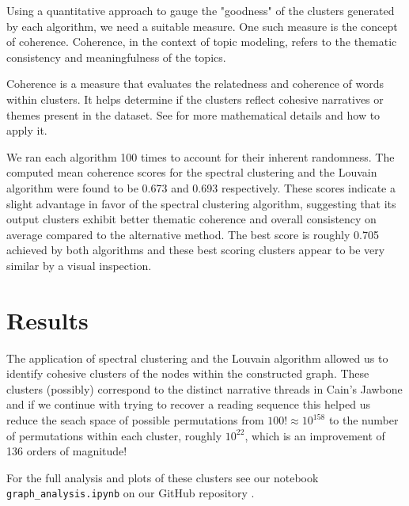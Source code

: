 \documentclass[a4paper]{article}
\begin{document}
Using a quantitative approach to gauge the "goodness" of the clusters generated by each algorithm, we need a suitable measure. One such measure is the concept of coherence. Coherence, in the context of topic modeling, refers to the thematic consistency and meaningfulness of the topics.

Coherence is a measure that evaluates the relatedness and coherence of words within clusters. It helps determine if the clusters reflect cohesive narratives or themes present in the dataset. See \cite{coherence} for more mathematical details and how to apply it.

We ran each algorithm 100 times to account for their inherent randomness. The computed mean coherence scores for the spectral clustering and the Louvain algorithm were found to be 0.673 and 0.693 respectively. These scores indicate a slight advantage in favor of the spectral clustering algorithm, suggesting that its output clusters exhibit better thematic coherence and overall consistency on average compared to the alternative method. The best score is roughly 0.705 achieved by both algorithms and these best scoring clusters appear to be very similar by a visual inspection.


\section{Results}

The application of spectral clustering and the Louvain algorithm allowed us to identify cohesive clusters of the nodes within the constructed graph. These clusters (possibly) correspond to the distinct narrative threads in Cain's Jawbone and if we continue with trying to recover a reading sequence this helped us reduce the seach space of possible permutations from $100! \approx 10^{158}$ to the number of permutations within each cluster, roughly $10^{22}$, which is an improvement of 136 orders of magnitude!

For the full analysis and plots of these clusters see our notebook \\ \verb|graph_analysis.ipynb| on our GitHub repository \cite{github}.


\printbibliography
\end{document}
